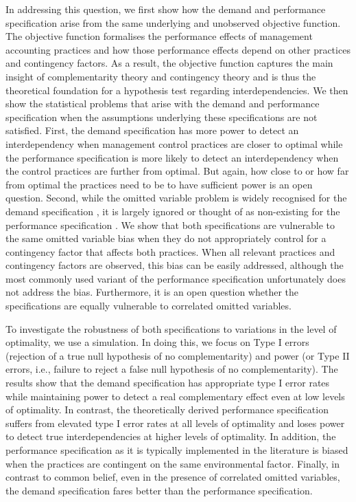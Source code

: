 \documentclass[12pt]{article}
\begin{document}
In addressing this question, we first show how the demand and performance specification arise from the same underlying and unobserved objective function. The objective function formalises the performance effects of management accounting practices and how those performance effects depend on other practices and contingency factors. As a result, the objective function captures the main insight of complementarity theory \citep{milgrom_complementarities_1995,grabner_management_2013} and contingency theory \citep{chenhall_management_2003,otley_contingency_2016} and is thus the theoretical foundation for a hypothesis test regarding interdependencies. We then show the statistical problems that arise with the demand and performance specification when the assumptions underlying these specifications are not satisfied. First, the demand specification has more power to detect an interdependency when management control practices are closer to optimal while the performance specification is more likely to detect an interdependency when the control practices are further from optimal. But again, how close to or how far from optimal the practices need to be to have sufficient power is an open question. Second, while the omitted variable problem is widely recognised for the demand specification \citep{grabner_management_2013, arora_testing_1996, hofmann_organizational_2017}, it is largely ignored \citep{grabner_management_2013, hofmann_organizational_2017} or thought of as non-existing for the performance specification \citep{carree_note_2011}. We show that both specifications are vulnerable to the same omitted variable bias when they do not appropriately control for a contingency factor that affects both practices. When all relevant practices and contingency factors are observed, this bias can be easily addressed, although the most commonly used variant of the performance specification unfortunately does not address the bias. Furthermore, it is an open question whether the specifications are equally vulnerable to correlated omitted variables.

To investigate the robustness of both specifications to variations in the level of optimality, we use a simulation. In doing this, we focus on Type I errors (rejection of a true null hypothesis of no complementarity) and power (or Type II errors, i.e., failure to reject a false null hypothesis of no complementarity). The results show that the demand specification has appropriate type I error rates while maintaining power to detect a real complementary effect even at low levels of optimality. In contrast, the theoretically derived performance specification suffers from elevated type I error rates at all levels of optimality and loses power to detect true interdependencies at higher levels of optimality. In addition, the performance specification as it is typically implemented in the literature is biased when the practices are contingent on the same environmental factor. Finally, in contrast to common belief, even in the presence of correlated omitted variables, the demand specification fares better than the performance specification.
\end{document}
